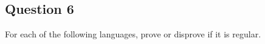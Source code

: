 \newpage
\subsection*{Question 6}

\noindent [20 pts] For each of the following languages, prove or disprove if it is regular.